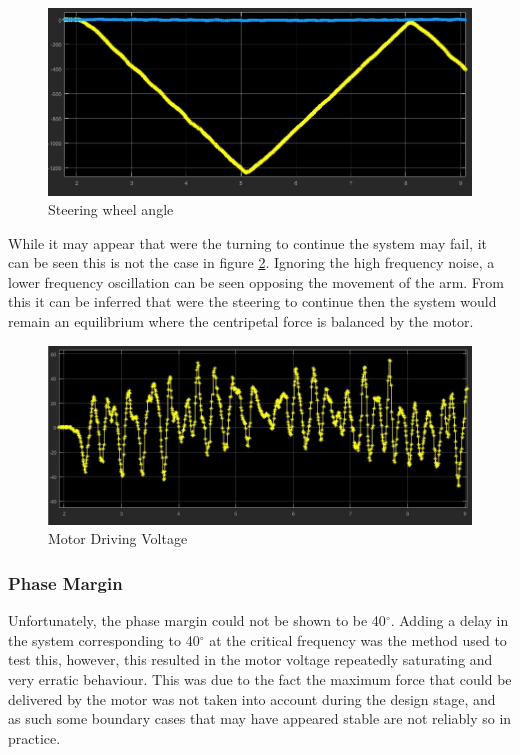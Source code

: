 \documentclass[11pt, a4paper,twocolumn ]{article}
\begin{document}
	\begin{figure}[h!]
	\begin{center}
	\includegraphics[width=\linewidth]{SteeringWheels.jpg}
	\caption{Steering wheel angle}
	\label{fig:4.5}
	\end{center}
	\end{figure}
While it may appear that were the turning to continue the system may fail, it can be seen this is not the case in figure \ref{fig:4.6}. Ignoring the high frequency noise, a lower frequency oscillation can be seen opposing the movement of the arm. From this it can be inferred that were the steering to continue then the system would remain an equilibrium where the centripetal force is balanced by the motor.
	\begin{figure}[h!]
	\begin{center}
	\includegraphics[width=\linewidth]{SteeringVoltage.jpg}
	\caption{Motor Driving Voltage}
	\label{fig:4.6}
	\end{center}
	\end{figure}

            \subsubsection{Phase Margin}
Unfortunately, the phase margin could not be shown to be 40$^\circ$. Adding a delay in the system corresponding to 40$^\circ$ at the critical frequency was the method used to test this, however, this resulted in the motor voltage repeatedly saturating and very erratic behaviour. This was due to the fact the maximum force that could be delivered by the motor was not taken into account during the design stage, and as such some boundary cases that may have appeared stable are not reliably so in practice.
\end{document}
